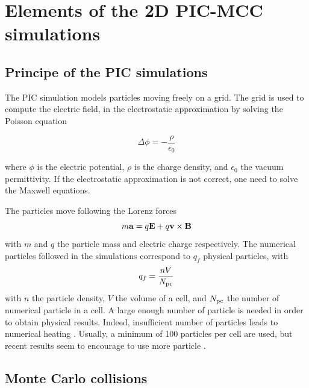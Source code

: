 
\section{Elements of the 2D PIC-MCC simulations}

  \subsection{Principe of the PIC simulations}

    The \ac{PIC} simulation models particles moving freely on a grid.
    The grid is used to compute the electric field, in the electrostatic approximation by solving the Poisson equation

    \begin{equation}
      \label{eq-poisson}
      \Delta \phi = - \frac{\rho}{\epsilon_0}
    \end{equation}

    where $\phi$ is the electric potential, $\rho$ is the charge density, and $\epsilon_0$ the vacuum permittivity.
    If the electrostatic approximation is not correct, one need to solve the Maxwell equations.

    The particles move following the Lorenz forces
    \begin{equation}
      \label{eq-Lor}
      m {\bf a} = q {\mathbf E} + q {\bf v} \times {\bf B}
    \end{equation}
    with $m$ and $q$ the particle mass and electric charge respectively.
    The numerical particles followed in the simulations correspond to $q_f$ physical particles, with
    \begin{equation}
      q_f = \frac{n V}{N_{\rm pc}}
    \end{equation}
    with $n$ the particle density, $V$ the volume of a cell, and $N_{\rm pc}$ the number of numerical particle in a cell.
    A large enough number of particle is needed in order to obtain physical results.
    Indeed, insufficient number of particles leads to numerical heating \cite{ueda1994}.
    Usually, a minimum of 100 particles per cell are used, but recent results seem to encourage to use more particle \cite{janhunen2018}.

  \subsection{Monte Carlo collisions}

